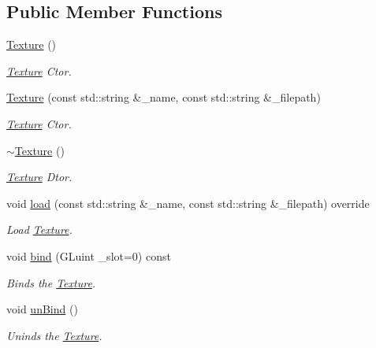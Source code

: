 \subsection*{Public Member Functions}
\begin{DoxyCompactItemize}
\item 
\hyperlink{class_cookie_eng_1_1_resources_1_1_texture_ae7d09944ac0d60a971de919b2fd7108d}{Texture} ()
\begin{DoxyCompactList}\small\item\em \hyperlink{class_cookie_eng_1_1_resources_1_1_texture}{Texture} Ctor. \end{DoxyCompactList}\item 
\hyperlink{class_cookie_eng_1_1_resources_1_1_texture_a8bcbd117b436060b0540c3c80dc88b54}{Texture} (const std\+::string \&\+\_\+name, const std\+::string \&\+\_\+filepath)
\begin{DoxyCompactList}\small\item\em \hyperlink{class_cookie_eng_1_1_resources_1_1_texture}{Texture} Ctor. \end{DoxyCompactList}\item 
\hyperlink{class_cookie_eng_1_1_resources_1_1_texture_ac5830da00fa12695714d1ed03d03a591}{$\sim$\+Texture} ()
\begin{DoxyCompactList}\small\item\em \hyperlink{class_cookie_eng_1_1_resources_1_1_texture}{Texture} Dtor. \end{DoxyCompactList}\item 
void \hyperlink{class_cookie_eng_1_1_resources_1_1_texture_a1f2d72c781dba6262ac5ca6e8898fc8d}{load} (const std\+::string \&\+\_\+name, const std\+::string \&\+\_\+filepath) override
\begin{DoxyCompactList}\small\item\em Load \hyperlink{class_cookie_eng_1_1_resources_1_1_texture}{Texture}. \end{DoxyCompactList}\item 
void \hyperlink{class_cookie_eng_1_1_resources_1_1_texture_a19f26d4ff9f73e05562e00532466f4df}{bind} (G\+Luint \+\_\+slot=0) const
\begin{DoxyCompactList}\small\item\em Binds the \hyperlink{class_cookie_eng_1_1_resources_1_1_texture}{Texture}. \end{DoxyCompactList}\item 
void \hyperlink{class_cookie_eng_1_1_resources_1_1_texture_a1af11a58e5dc08fa18baeba8cee62109}{un\+Bind} ()
\begin{DoxyCompactList}\small\item\em Uninds the \hyperlink{class_cookie_eng_1_1_resources_1_1_texture}{Texture}. \end{DoxyCompactList}\item 

\end{DoxyCompactItemize}
